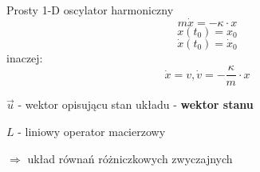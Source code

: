 \begin{frame}{Prosty 1-D oscylator harmoniczny}
  $$m\dot x = -\kappa \cdot x$$
  $$ x(t_0)=x_0$$
  $$\dot x(t_0) = \dot x_0$$
  inaczej:
  $$\dot x = v, \dot v = - \frac{\kappa}{m} \cdot x$$

  $\vec{u}$ - wektor opisującu stan układu - \textbf{wektor stanu} \par
  $L$ - liniowy operator macierzowy \par\par
  $\Rightarrow$ układ równań różniczkowych zwyczajnych
\end{frame}